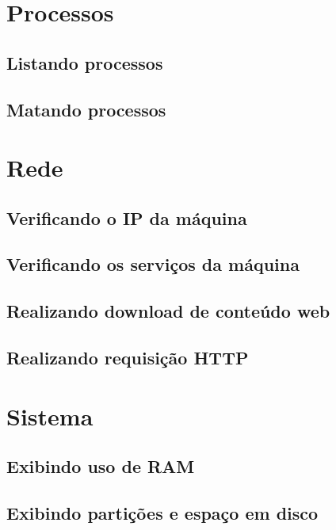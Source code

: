 \documentclass[a4paper,10pt]{article}
\begin{document}
\section{Processos}
\subsection{Listando processos}
\subsection{Matando processos}

%
\section{Rede}
\subsection{Verificando o IP da máquina}
\subsection{Verificando os serviços da máquina}
\subsection{Realizando download de conteúdo web}
\subsection{Realizando requisição HTTP}

\section{Sistema}
\subsection{Exibindo uso de RAM}
\subsection{Exibindo partições e espaço em disco}
\end{document}
